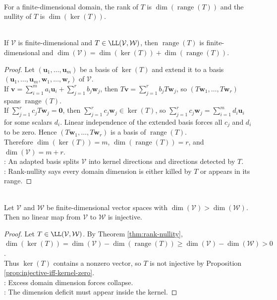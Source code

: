\begin{definition} \\
For a finite-dimensional domain, the rank of $T$ is $\dim(\operatorname{range}(T))$ and the nullity of $T$ is $\dim(\ker(T))$.
\end{definition}

\begin{theorem} \label{thm:rank-nullity} \\
If $\mathcal{V}$ is finite-dimensional and $T \in \LL(\mathcal{V}, \mathcal{W})$, then $\operatorname{range}(T)$ is finite-dimensional and $\dim(\mathcal{V}) = \dim(\ker(T)) + \dim(\operatorname{range}(T))$.
\begin{proof}
Let $(\mathbf{u}_1,\ldots,\mathbf{u}_m)$ be a basis of $\ker(T)$ and extend it to a basis $(\mathbf{u}_1,\ldots,\mathbf{u}_m,\mathbf{w}_1,\ldots,\mathbf{w}_r)$ of $\mathcal{V}$.\\
If $\mathbf{v}=\sum_{i=1}^m a_i\mathbf{u}_i+\sum_{j=1}^r b_j\mathbf{w}_j$, then $T\mathbf{v}=\sum_{j=1}^r b_jT\mathbf{w}_j$, so $(T\mathbf{w}_1,\ldots,T\mathbf{w}_r)$ spans $\operatorname{range}(T)$.\\
If $\sum_{j=1}^r c_jT\mathbf{w}_j=\mathbf{0}$, then $\sum_{j=1}^r c_j\mathbf{w}_j\in\ker(T)$, so $\sum_{j=1}^r c_j\mathbf{w}_j=\sum_{i=1}^m d_i\mathbf{u}_i$ for some scalars $d_i$. Linear independence of the extended basis forces all $c_j$ and $d_i$ to be zero. Hence $(T\mathbf{w}_1,\ldots,T\mathbf{w}_r)$ is a basis of $\operatorname{range}(T)$.\\
Therefore $\dim(\ker(T))=m$, $\dim(\operatorname{range}(T))=r$, and $\dim(\mathcal{V})=m+r$.\\
: An adapted basis splits $\mathcal{V}$ into kernel directions and directions detected by $T$.\\
: Rank-nullity says every domain dimension is either killed by $T$ or appears in its range.
\end{proof}
\end{theorem}

\begin{corollary} \label{cor:map-to-smaller-space-not-injective} \\
Let $\mathcal{V}$ and $\mathcal{W}$ be finite-dimensional vector spaces with $\dim(\mathcal{V})>\dim(\mathcal{W})$.\\
Then no linear map from $\mathcal{V}$ to $\mathcal{W}$ is injective.
\begin{proof}
Let $T\in\LL(\mathcal{V},\mathcal{W})$. By Theorem \ref{thm:rank-nullity}, $\dim(\ker(T))=\dim(\mathcal{V})-\dim(\operatorname{range}(T)) \geq \dim(\mathcal{V})-\dim(\mathcal{W})>0$.\\
Thus $\ker(T)$ contains a nonzero vector, so $T$ is not injective by Proposition \ref{prop:injective-iff-kernel-zero}.\\
: Excess domain dimension forces collapse.\\
: The dimension deficit must appear inside the kernel.
\end{proof}
\end{corollary}

